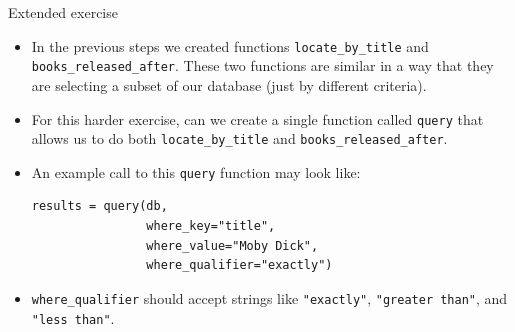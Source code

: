 \documentclass[10pt]{beamer}
\begin{document}
\begin{frame}[label={sec:org859d147},fragile]{Extended exercise}
 \begin{itemize}
\item In the previous steps we created functions \texttt{locate\_by\_title} and
\texttt{books\_released\_after}. These two functions are similar in a way that they are
selecting a subset of our database (just by different criteria).
\item For this harder exercise, can we create a single function called \texttt{query} that allows
us to do both \texttt{locate\_by\_title} and \texttt{books\_released\_after}.
\item An example call to this \texttt{query} function may look like:

\begin{verbatim}
results = query(db,
                where_key="title",
                where_value="Moby Dick",
                where_qualifier="exactly")
\end{verbatim}

\item \texttt{where\_qualifier} should accept strings like \texttt{"exactly"}, \texttt{"greater than"}, and \texttt{"less
  than"}.
\end{itemize}
\end{frame}
\end{document}
